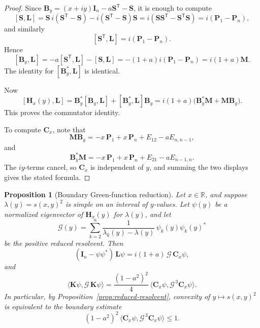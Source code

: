 \documentclass[11pt]{article}
\newtheorem{proposition}[theorem]{Proposition}
\begin{document}
\begin{proof}
Since \(\mathbf B_y=(x+iy)\mathbf I_n-a\mathbf S^{\mathsf T}-\mathbf S\), it is enough to compute
\[
[\mathbf S,\mathbf L]
=
\mathbf S\,i(\mathbf S^{\mathsf T}-\mathbf S)-i(\mathbf S^{\mathsf T}-\mathbf S)\mathbf S
=
i(\mathbf S\mathbf S^{\mathsf T}-\mathbf S^{\mathsf T}\mathbf S)
=
i(\mathbf P_1-\mathbf P_n),
\]
and similarly
\[
[\mathbf S^{\mathsf T},\mathbf L]
=
i(\mathbf P_1-\mathbf P_n).
\]
Hence
\[
[\mathbf B_y,\mathbf L]
=
-a[\mathbf S^{\mathsf T},\mathbf L]-[\mathbf S,\mathbf L]
=
-(1+a)i(\mathbf P_1-\mathbf P_n)
=
i(1+a)\mathbf M.
\]
The identity for \([\mathbf B_y^*,\mathbf L]\) is identical.

Now
\[
[\mathbf H_x(y),\mathbf L]
=
\mathbf B_y^*[\mathbf B_y,\mathbf L]+[\mathbf B_y^*,\mathbf L]\mathbf B_y
=
i(1+a)\bigl(\mathbf B_y^*\mathbf M+\mathbf M\mathbf B_y\bigr).
\]
This proves the commutator identity.

To compute \(\mathbf C_x\), note that
\[
\mathbf M\mathbf B_y
=
-\!x\,\mathbf P_1
+ x\,\mathbf P_n
+E_{12}
-aE_{n,n-1},
\]
and
\[
\mathbf B_y^*\mathbf M
=
-\!x\,\mathbf P_1
+ x\,\mathbf P_n
+E_{21}
-aE_{n-1,n}.
\]
The \(iy\)-terms cancel, so \(\mathbf C_x\) is independent of \(y\), and summing the two displays gives the stated formula.
\end{proof}

\begin{proposition}[Boundary Green-function reduction]\label{prop:boundary-green}
Let \(x\in\mathbb R\), and suppose \(\lambda(y)=s(x,y)^2\) is simple on an interval of \(y\)-values.  Let \(\psi(y)\) be a normalized eigenvector of \(\mathbf H_x(y)\) for \(\lambda(y)\), and let
\[
\mathcal G(y)
=
\sum_{k=2}^n \frac{1}{\lambda_k(y)-\lambda(y)}\,\psi_k(y)\psi_k(y)^*
\]
be the positive reduced resolvent. Then
\[
(\mathbf I_n-\psi\psi^*)\,\mathbf L\psi
=
i(1+a)\,\mathcal G\,\mathbf C_x\psi,
\]
and
\[
\boxed{
\bigl\langle \mathbf K\psi,\mathcal G\,\mathbf K\psi\bigr\rangle
=
\frac{(1-a^2)^2}{4}\,
\bigl\langle \mathbf C_x\psi,\mathcal G^{\,3}\mathbf C_x\psi\bigr\rangle.
}
\]
In particular, by Proposition~\ref{prop:reduced-resolvent}, convexity of \(y\mapsto s(x,y)^2\) is equivalent to the boundary estimate
\[
(1-a^2)^2\,
\bigl\langle \mathbf C_x\psi,\mathcal G^{\,3}\mathbf C_x\psi\bigr\rangle
\le 1.
\]
\end{proposition}
\end{document}
